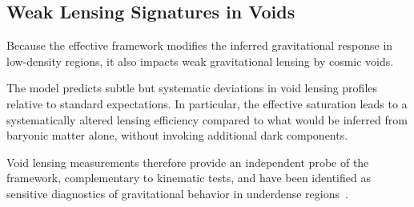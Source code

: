 \subsection{Weak Lensing Signatures in Voids}
  \label{subsec:void_lensing}

  Because the effective framework modifies the inferred gravitational response
  in low-density regions, it also impacts weak gravitational lensing by cosmic
  voids.

  The model predicts subtle but systematic deviations in void lensing profiles
  relative to standard expectations.
  In particular, the effective saturation leads to a systematically altered
  lensing efficiency compared to what would be inferred from baryonic matter
  alone, without invoking additional dark components.

  Void lensing measurements therefore provide an independent probe of the
  framework, complementary to kinematic tests, and have been identified as
  sensitive diagnostics of gravitational behavior in underdense
  regions~\cite{Cai2017VoidLensing}.
